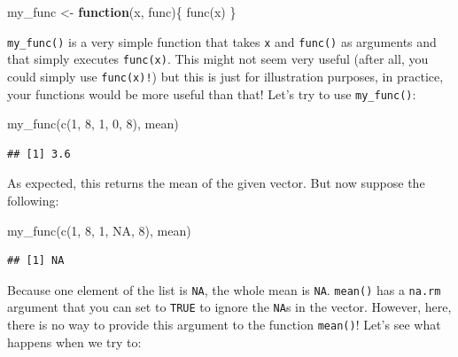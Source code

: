 \documentclass[
]{article}
\newenvironment{Shaded}{\begin{snugshade}}{\end{snugshade}}
\newcommand{\ConstantTok}[1]{\textcolor[rgb]{0.00,0.00,0.00}{#1}}
\newcommand{\ControlFlowTok}[1]{\textcolor[rgb]{0.13,0.29,0.53}{\textbf{#1}}}
\newcommand{\DecValTok}[1]{\textcolor[rgb]{0.00,0.00,0.81}{#1}}
\newcommand{\FunctionTok}[1]{\textcolor[rgb]{0.00,0.00,0.00}{#1}}
\newcommand{\NormalTok}[1]{#1}
\newcommand{\OtherTok}[1]{\textcolor[rgb]{0.56,0.35,0.01}{#1}}
\begin{document}
\begin{Shaded}
\begin{Highlighting}[]
\NormalTok{my\_func }\OtherTok{\textless{}{-}} \ControlFlowTok{function}\NormalTok{(x, func)\{}
  \FunctionTok{func}\NormalTok{(x)}
\NormalTok{\}}
\end{Highlighting}
\end{Shaded}

\texttt{my\_func()} is a very simple function that takes \texttt{x} and \texttt{func()} as arguments and that simply
executes \texttt{func(x)}. This might not seem very useful (after all, you could simply use \texttt{func(x)!}) but
this is just for illustration purposes, in practice, your functions would be more useful than that!
Let's try to use \texttt{my\_func()}:

\begin{Shaded}
\begin{Highlighting}[]
\FunctionTok{my\_func}\NormalTok{(}\FunctionTok{c}\NormalTok{(}\DecValTok{1}\NormalTok{, }\DecValTok{8}\NormalTok{, }\DecValTok{1}\NormalTok{, }\DecValTok{0}\NormalTok{, }\DecValTok{8}\NormalTok{), mean)}
\end{Highlighting}
\end{Shaded}

\begin{verbatim}
## [1] 3.6
\end{verbatim}

As expected, this returns the mean of the given vector. But now suppose the following:

\begin{Shaded}
\begin{Highlighting}[]
\FunctionTok{my\_func}\NormalTok{(}\FunctionTok{c}\NormalTok{(}\DecValTok{1}\NormalTok{, }\DecValTok{8}\NormalTok{, }\DecValTok{1}\NormalTok{, }\ConstantTok{NA}\NormalTok{, }\DecValTok{8}\NormalTok{), mean)}
\end{Highlighting}
\end{Shaded}

\begin{verbatim}
## [1] NA
\end{verbatim}

Because one element of the list is \texttt{NA}, the whole mean is \texttt{NA}. \texttt{mean()} has a \texttt{na.rm} argument
that you can set to \texttt{TRUE} to ignore the \texttt{NA}s in the vector. However, here, there is no way to
provide this argument to the function \texttt{mean()}! Let's see what happens when we try to:
\end{document}
